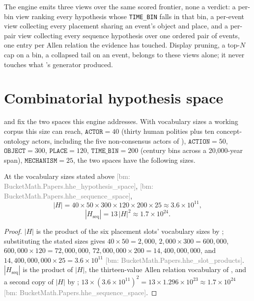 \documentclass[11pt]{article}
\newcommand{\bm}[1]{\textcolor{gray}{\footnotesize [bm: #1]}}
\begin{document}
The engine emits three views over the same scored frontier, none a
verdict: a per-bin view ranking every hypothesis whose \texttt{TIME\_BIN}
falls in that bin, a per-event view collecting every placement sharing an
event's object and place, and a per-pair view collecting every sequence
hypothesis over one ordered pair of events, one entry per Allen relation
the evidence has touched. Display pruning, a top-$N$ cap on a bin, a
collapsed tail on an event, belongs to these views alone; it never
touches what 's generator produced.

\section{Combinatorial hypothesis space}
\label{sec:combinatorics}

 and  fix the two spaces this
engine addresses. With vocabulary sizes a working corpus this size can
reach, $\mathtt{ACTOR} = 40$ (thirty human polities plus ten
concept-ontology actors, including the five non-consensus actors of
), $\mathtt{ACTION} = 50$, $\mathtt{OBJECT} = 300$,
$\mathtt{PLACE} = 120$, $\mathtt{TIME\_BIN} = 200$ (century bins across a
20,000-year span), $\mathtt{MECHANISM} = 25$, the two spaces have the
following sizes.

\begin{lemma}
\label{lem:size}
At the vocabulary sizes stated above \bm{BucketMath.Papers.hhe\_hypothesis\_space}, \bm{BucketMath.Papers.hhe\_sequence\_space},
\begin{equation}
  \label{eq:size-h}
  |H| = 40 \times 50 \times 300 \times 120 \times 200 \times 25 \approx 3.6 \times 10^{11},
\end{equation}
\begin{equation}
  \label{eq:size-hseq}
  |H_{\mathrm{seq}}| = 13 \, |H|^2 \approx 1.7 \times 10^{24}.
\end{equation}
\end{lemma}

\begin{proof}
$|H|$ is the product of the six placement slots' vocabulary sizes by
; substituting the stated sizes gives
$40 \times 50 = 2{,}000$, $2{,}000 \times 300 = 600{,}000$,
$600{,}000 \times 120 = 72{,}000{,}000$,
$72{,}000{,}000 \times 200 = 14{,}400{,}000{,}000$, and
$14{,}400{,}000{,}000 \times 25 = 3.6 \times 10^{11}$ \bm{BucketMath.Papers.hhe\_slot\_products}. $|H_{\mathrm{seq}}|$
is the product of $|H|$, the thirteen-value Allen relation vocabulary of
, and a second copy of $|H|$ by ;
$13 \times (3.6 \times 10^{11})^2 = 13 \times 1.296 \times 10^{23}
\approx 1.7 \times 10^{24}$ \bm{BucketMath.Papers.hhe\_sequence\_space}.
\end{proof}
\end{document}
